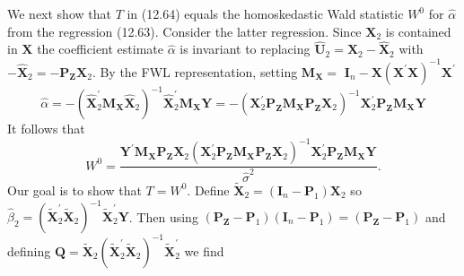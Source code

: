 \documentclass[10pt]{article}
\begin{document}
We next show that $T$ in (12.64) equals the homoskedastic Wald statistic $W^{0}$ for $\widehat{\alpha}$ from the regression (12.63). Consider the latter regression. Since $\boldsymbol{X}_{2}$ is contained in $\boldsymbol{X}$ the coefficient estimate $\widehat{\alpha}$ is invariant to replacing $\widehat{\boldsymbol{U}}_{2}=\boldsymbol{X}_{2}-\widehat{\boldsymbol{X}}_{2}$ with $-\widehat{\boldsymbol{X}}_{2}=-\boldsymbol{P}_{\boldsymbol{Z}} \boldsymbol{X}_{2}$. By the FWL representation, setting $\boldsymbol{M}_{\boldsymbol{X}}=$ $\boldsymbol{I}_{n}-\boldsymbol{X}\left(\boldsymbol{X}^{\prime} \boldsymbol{X}\right)^{-1} \boldsymbol{X}^{\prime}$
$$
\widehat{\alpha}=-\left(\widehat{\boldsymbol{X}}_{2}^{\prime} \boldsymbol{M}_{\boldsymbol{X}} \widehat{\boldsymbol{X}}_{2}\right)^{-1} \widehat{\boldsymbol{X}}_{2}^{\prime} \boldsymbol{M}_{\boldsymbol{X}} \boldsymbol{Y}=-\left(\boldsymbol{X}_{2}^{\prime} \boldsymbol{P}_{\boldsymbol{Z}} \boldsymbol{M}_{\boldsymbol{X}} \boldsymbol{P}_{\boldsymbol{Z}} \boldsymbol{X}_{2}\right)^{-1} \boldsymbol{X}_{2}^{\prime} \boldsymbol{P}_{\boldsymbol{Z}} \boldsymbol{M}_{\boldsymbol{X}} \boldsymbol{Y}
$$
It follows that
$$
W^{0}=\frac{\boldsymbol{Y}^{\prime} \boldsymbol{M}_{\boldsymbol{X}} \boldsymbol{P}_{\boldsymbol{Z}} \boldsymbol{X}_{2}\left(\boldsymbol{X}_{2}^{\prime} \boldsymbol{P}_{\boldsymbol{Z}} \boldsymbol{M}_{\boldsymbol{X}} \boldsymbol{P}_{\boldsymbol{Z}} \boldsymbol{X}_{2}\right)^{-1} \boldsymbol{X}_{2}^{\prime} \boldsymbol{P}_{\boldsymbol{Z}} \boldsymbol{M}_{\boldsymbol{X}} \boldsymbol{Y}}{\widehat{\sigma}^{2}} .
$$
Our goal is to show that $T=W^{0}$. Define $\widetilde{\boldsymbol{X}}_{2}=\left(\boldsymbol{I}_{n}-\boldsymbol{P}_{1}\right) \boldsymbol{X}_{2}$ so $\widehat{\beta}_{2}=\left(\widetilde{\boldsymbol{X}}_{2}^{\prime} \widetilde{\boldsymbol{X}}_{2}\right)^{-1} \widetilde{\boldsymbol{X}}_{2}^{\prime} \boldsymbol{Y}$. Then using $\left(\boldsymbol{P}_{\boldsymbol{Z}}-\boldsymbol{P}_{1}\right)\left(\boldsymbol{I}_{n}-\boldsymbol{P}_{1}\right)=\left(\boldsymbol{P}_{\boldsymbol{Z}}-\boldsymbol{P}_{1}\right)$ and defining $\boldsymbol{Q}=\widetilde{\boldsymbol{X}}_{2}\left(\widetilde{\boldsymbol{X}}_{2}^{\prime} \tilde{\boldsymbol{X}}_{2}\right)^{-1} \widetilde{\boldsymbol{X}}_{2}^{\prime}$ we find
\end{document}

